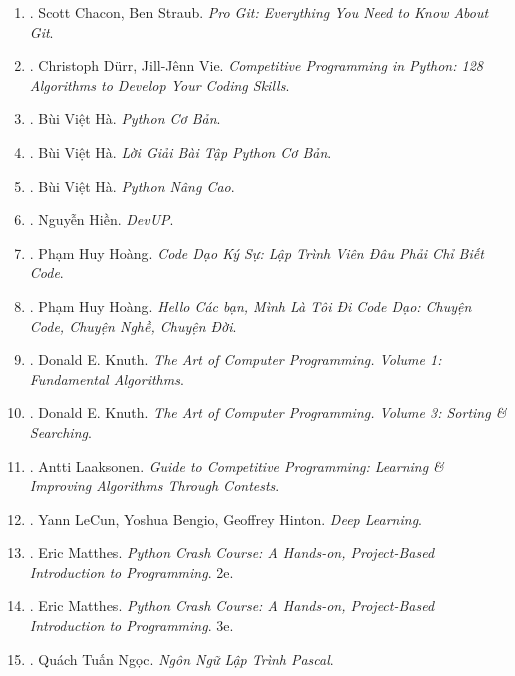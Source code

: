 \documentclass{article}
\begin{document}
\begin{enumerate}
	\item \cite{Chacon_Straub2014}. Scott Chacon, Ben Straub. \textit{Pro Git: Everything You Need to Know About Git}.\hfill{\sf[reading]}
	\item \cite{Durr_Vie2021}. Christoph D\"urr, Jill-J\^enn Vie. \textit{Competitive Programming in Python: 128 Algorithms to Develop Your Coding Skills}.\\\mbox{}\hfill{\sf[reading]}
	\item \cite{Ha_Python_co_ban}. Bùi Việt Hà. \textit{Python Cơ Bản}.\hfill{\sf[done]}
	\item \cite{Ha_loi_giai_BT_Python_co_ban}. Bùi Việt Hà. \textit{Lời Giải Bài Tập Python Cơ Bản}.\hfill{\sf[reading]}
	\item \cite{Ha_Python_nang_cao}. Bùi Việt Hà. \textit{Python Nâng Cao}.\hfill{\sf[done]}
	\item \cite{Hien_DevUp}. Nguyễn Hiền. \textit{DevUP}.\hfill{\sf[done]}
	\item \cite{Hoang_code_dao_ky_su}. Phạm Huy Hoàng. \textit{Code Dạo Ký Sự: Lập Trình Viên Đâu Phải Chỉ Biết Code}.\hfill{\sf[done]}
	\item \cite{Hoang_toi_di_code_dao}. Phạm Huy Hoàng. \textit{Hello Các bạn, Mình Là Tôi Đi Code Dạo: Chuyện Code, Chuyện Nghề, Chuyện Đời}.\hfill{\sf[done]}
	\item \cite{Knuth1997}. Donald E. Knuth. \textit{The Art of Computer Programming. Volume 1: Fundamental Algorithms}.\hfill{\sf[reading]}
	\item \cite{Knuth1998}. Donald E. Knuth. \textit{The Art of Computer Programming. Volume 3: Sorting \& Searching}.\hfill{\sf[reading]}
	\item \cite{Laaksonen2020}. Antti Laaksonen. \textit{Guide to Competitive Programming: Learning \& Improving Algorithms Through Contests}.\hfill{\sf[reading]}
	\item \cite{LeCun_Bengio_Hinton2015}. Yann LeCun, Yoshua Bengio, Geoffrey Hinton. \textit{Deep Learning}.\hfill{\sf[reading]}
	\item \cite{Matthes2019}. Eric Matthes. \textit{Python Crash Course: A Hands-on, Project-Based Introduction to Programming}. 2e.\hfill{\sf[reading]}
	\item \cite{Matthes2023}. Eric Matthes. \textit{Python Crash Course: A Hands-on, Project-Based Introduction to Programming}. 3e.\hfill{\sf[reading]}
	\item \cite{Ngoc_Pascal}. Quách Tuấn Ngọc. \textit{Ngôn Ngữ Lập Trình Pascal}.\hfill{\sf[reading]}

\end{enumerate}
\end{document}
